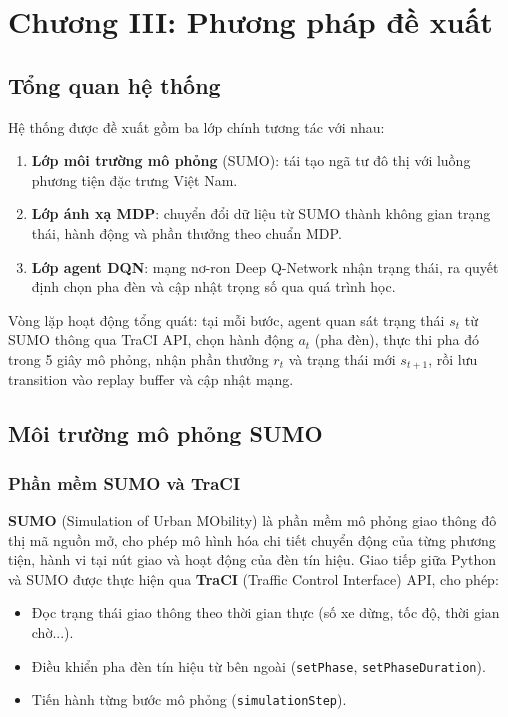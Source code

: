 \section{Chương III: Phương pháp đề xuất}

\subsection{Tổng quan hệ thống}

Hệ thống được đề xuất gồm ba lớp chính tương tác với nhau:

\begin{enumerate}
    \item \textbf{Lớp môi trường mô phỏng} (SUMO): tái tạo ngã tư đô thị với luồng phương tiện đặc trưng Việt Nam.
    \item \textbf{Lớp ánh xạ MDP}: chuyển đổi dữ liệu từ SUMO thành không gian trạng thái, hành động và phần thưởng theo chuẩn MDP.
    \item \textbf{Lớp agent DQN}: mạng nơ-ron Deep Q-Network nhận trạng thái, ra quyết định chọn pha đèn và cập nhật trọng số qua quá trình học.
\end{enumerate}

Vòng lặp hoạt động tổng quát: tại mỗi bước, agent quan sát trạng thái $s_t$ từ SUMO thông qua TraCI API, chọn hành động $a_t$ (pha đèn), thực thi pha đó trong 5 giây mô phỏng, nhận phần thưởng $r_t$ và trạng thái mới $s_{t+1}$, rồi lưu transition vào replay buffer và cập nhật mạng.

\subsection{Môi trường mô phỏng SUMO}

\subsubsection{Phần mềm SUMO và TraCI}

\textbf{SUMO} (Simulation of Urban MObility) là phần mềm mô phỏng giao thông đô thị mã nguồn mở, cho phép mô hình hóa chi tiết chuyển động của từng phương tiện, hành vi tại nút giao và hoạt động của đèn tín hiệu. Giao tiếp giữa Python và SUMO được thực hiện qua \textbf{TraCI} (Traffic Control Interface) API, cho phép:
\begin{itemize}
    \item Đọc trạng thái giao thông theo thời gian thực (số xe dừng, tốc độ, thời gian chờ...).
    \item Điều khiển pha đèn tín hiệu từ bên ngoài (\texttt{setPhase}, \texttt{setPhaseDuration}).
    \item Tiến hành từng bước mô phỏng (\texttt{simulationStep}).
\end{itemize}

